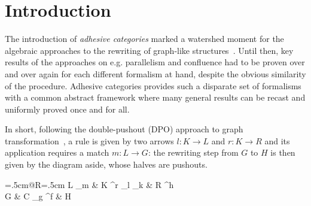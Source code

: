 \documentclass[3p]{elsarticle}
\theoremstyle{remark}
\theoremstyle{definition}
\begin{document}
\section{Introduction}
The introduction of \emph{adhesive categories} marked a watershed moment for the algebraic approaches 
to the rewriting of graph-like structures~\cite{lack2005adhesive,ehrig2006fundamentals}.
%
Until then, key results of the approaches on e.g. parallelism and confluence had to be proven 
over and over again for each different formalism at hand, %
despite the obvious similarity of the procedure.
%
Adhesive categories provides such a disparate set of formalisms with a common abstract framework 
where many general results can be recast and uniformly proved once and for all.
 
\noindent
\begin{minipage}[l]{.78\linewidth}
		\setlength{\parindent}{1.5em}
		In short, following the double-pushout (DPO) approach
to graph transformation~\cite{CorradiniMREHL97,ehrig2006fundamentals}, 
a rule is given by two arrows $l: K \to L$ and $r: K \rightarrow R$
and its application requires a match $m: L \to G$: the rewriting step from $G$
to $H$ is then given by the diagram aside, whose halves are pushouts.
  \end{minipage}%
    \hfill 
  \begin{minipage}[r]{.20\linewidth }
    \xymatrix@C=.5cm@R=.5cm{
      L \ar[d]_{m}
      & K \ar[r]^r \ar[l]_{l} \ar[d]_{k} & R \ar [d]^h \\
      G & C \ar[r]_{g} \ar[l]^{f}                    & H
    }
  \end{minipage}
  \vspace{.01cm}
\end{document}

